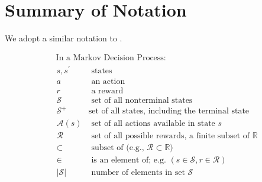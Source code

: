 \documentclass[12pt]{article}
\begin{document}
\listoftodos

\tableofcontents

\section{Summary of Notation}
We adopt a similar notation to \citeauthor{ReinforcementLearningIntroduction_Sutton.Barto_2018} \cite{ReinforcementLearningIntroduction_Sutton.Barto_2018}.

\begin{align*}
      & \text { In a Markov Decision Process: }  \\
      & \begin{array}{ll}
        s, s^{\prime}   & \text { states }                                                       \\
        a               & \text { an action }                                                    \\
        r               & \text { a reward }                                                     \\
        \mathcal{S}     & \text { set of all nonterminal states }                                \\
        \mathcal{S}^{+} & \text {set of all states, including the terminal state }               \\
        \mathcal{A}(s)  & \text { set of all actions available in state } s                      \\
        \mathcal{R}     & \text { set of all possible rewards, a finite subset of } \mathbb{R}   \\
        \subset         & \text { subset of (e.g., } \mathcal{R} \subset \mathbb{R})             \\
        \in             & \text { is an element of; e.g. }(s \in \mathcal{S}, r \in \mathcal{R}) \\
        |\mathcal{S}|   & \text { number of elements in set } \mathcal{S}
    \end{array}
\end{align*}

\end{document}
